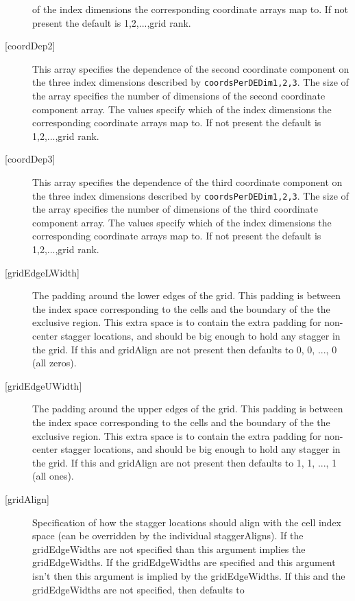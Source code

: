 \begin{description}
       of the index dimensions the corresponding coordinate
       arrays map to. If not present the default is 1,2,...,grid rank.
   \item[{[coordDep2]}]
       This array specifies the dependence of the second
       coordinate component on the three index dimensions
       described by {\tt coordsPerDEDim1,2,3}. The size of the
       array specifies the number of dimensions of the second
       coordinate component array. The values specify which
       of the index dimensions the corresponding coordinate
       arrays map to. If not present the default is 1,2,...,grid rank.
   \item[{[coordDep3]}]
       This array specifies the dependence of the third
       coordinate component on the three index dimensions
       described by {\tt coordsPerDEDim1,2,3}. The size of the
       array specifies the number of dimensions of the third
       coordinate component array. The values specify which
       of the index dimensions the corresponding coordinate
       arrays map to. If not present the default is 1,2,...,grid rank.
   \item[{[gridEdgeLWidth]}]
        The padding around the lower edges of the grid. This padding is between
        the index space corresponding to the cells and the boundary of the
        the exclusive region. This extra space is to contain the extra
        padding for non-center stagger locations, and should be big enough
        to hold any stagger in the grid. If this and gridAlign are not present then
        defaults to 0, 0, ..., 0 (all zeros).
   \item[{[gridEdgeUWidth]}]
        The padding around the upper edges of the grid. This padding is between
        the index space corresponding to the cells and the boundary of the
        the exclusive region. This extra space is to contain the extra
        padding for non-center stagger locations, and should be big enough
        to hold any stagger in the grid. If this and gridAlign are not present then
        defaults to 1, 1, ..., 1 (all ones).
   \item[{[gridAlign]}]
       Specification of how the stagger locations should align with the cell
       index space (can be overridden by the individual staggerAligns). If
       the gridEdgeWidths are not specified than this argument
       implies the gridEdgeWidths. If the gridEdgeWidths are specified and this argument isn't
       then this argument is implied by the gridEdgeWidths.
       If this and the gridEdgeWidths are not specified, then defaults to

\end{description}
